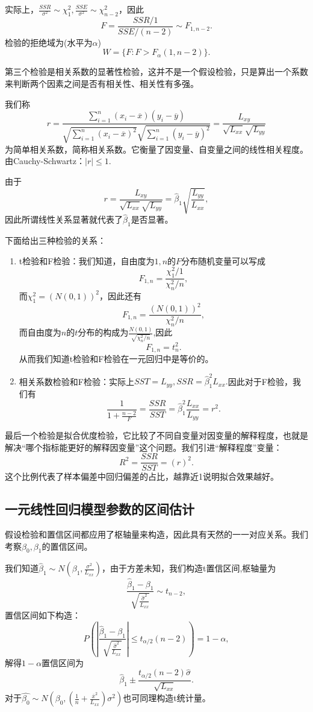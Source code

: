 \documentclass[lang=cn,10pt]{elegantbook}
\begin{document}
    实际上，\(\frac{SSR}{\sigma^2}\sim \chi^2_1,\frac{SSE}{\sigma^2}\sim \chi^2_{n-2}\)，因此
    \[F=\frac{SSR/1}{SSE/(n-2)}\sim F_{1,n-2}.\]
    检验的拒绝域为(水平为\(\alpha\))
    \[W=\{F:F>F_{\alpha}(1,n-2)\}.\]

    第三个检验是相关系数的显著性检验，这并不是一个假设检验，只是算出一个系数来判断两个因素之间是否有相关性、相关性有多强。

    我们称
    \[r=\frac{\sum_{i=1}^{n}(x_i-\overline{x})(y_i-\overline{y})}{\sqrt{\sum_{i=1}^{n}(x_i-\overline{x})^2}\sqrt{\sum_{i=1}^{n}(y_i-\overline{y})^2}}=\frac{L_{xy}}{\sqrt{L_{xx}}\sqrt{L_{yy}}}\]
    为简单相关系数，简称相关系数。它衡量了因变量、自变量之间的线性相关程度。由Cauchy-Schwartz：\(|r|\le1.\)

    由于\[r=\frac{L_{xy}}{\sqrt{L_{xx}}\sqrt{L_{yy}}}=\hat{\beta}_1\sqrt{\frac{L_{yy}}{L_{xx}}},\]因此所谓线性关系显著就代表了\(\hat{\beta}_1\)是否显著。

    下面给出三种检验的关系：
    \begin{enumerate}
        \item t检验和F检验：我们知道，自由度为\(1,n\)的\(F\)分布随机变量可以写成\[F_{1,n}=\frac{\chi^2_1/1}{\chi^2_n/n},\]而\(\chi^2_1=(N(0,1))^2\)，因此还有\[F_{1,n}=\frac{(N(0,1))^2}{\chi^2_n/n},\]而自由度为\(n\)的\(t\)分布的构成为\(\frac{N(0,1)}{\sqrt{\chi^2_n/n}}\),因此\[F_{1,n}=t_n^2.\]从而我们知道t检验和F检验在一元回归中是等价的。
        \item 相关系数检验和F检验：实际上\(SST=L_{yy},SSR=\hat{\beta}_1^2L_{xx}.\)因此对于F检验，我们有\[\frac{1}{1+\frac{n-2}{F}}=\frac{SSR}{SST}=\hat{\beta}_1^2\frac{L_{xx}}{L_{yy}}=r^2.\]
    \end{enumerate}

    最后一个检验是拟合优度检验，它比较了不同自变量对因变量的解释程度，也就是解决“哪个指标能更好的解释因变量”这个问题。我们引进“解释程度”变量：
    \[R^2=\frac{SSR}{SST}=(r)^2.\]
    这个比例代表了样本偏差中回归偏差的占比，越靠近1说明拟合效果越好。

    \subsection{一元线性回归模型参数的区间估计}
     假设检验和置信区间都应用了枢轴量来构造，因此具有天然的一一对应关系。我们考察\(\beta_0,\beta_1\)的置信区间。

     我们知道\(\hat{\beta}_1\sim N(\beta_1,\frac{\sigma^2}{L_{xx}})\)，由于方差未知，我们构造t置信区间,枢轴量为
     \[\frac{\hat{\beta}_1-\beta_1}{\sqrt{\frac{\hat{\sigma}^2}{L_{xx}}}}\sim t_{n-2},\]
     置信区间如下构造：
     \[P(|\frac{\hat{\beta}_1-\beta_1}{\sqrt{\frac{\hat{\sigma}^2}{L_{xx}}}}|\le t_{\alpha/2}(n-2))=1-\alpha,\]
     解得\(1-\alpha\)置信区间为
     \[\hat{\beta}_1\pm \frac{t_{\alpha/2}(n-2)\hat{\sigma}}{\sqrt{L_{xx}}}.\]
    对于\(\hat{\beta_0}\sim N(\beta_0,(\frac{1}{n}+\frac{\overline{x}^2}{L_{xx}})\sigma^2)\)也可同理构造t统计量。
\end{document}
